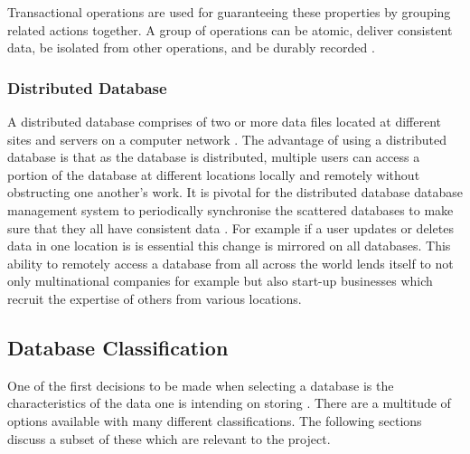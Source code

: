 Transactional operations are used for guaranteeing these properties by grouping related actions together. A group of operations can be atomic, deliver consistent data, be isolated from other operations, and be durably recorded \cite{acidtrans}.

\subsubsection{Distributed Database}\label{distributeddb}
A distributed database comprises of two or more data files located at different sites and servers on a computer network \cite{dd}. The advantage of using a distributed database is that as the database is distributed, multiple users can access a portion of the database at different locations locally and remotely without obstructing one another's work. It is  pivotal for the distributed database database management system to periodically synchronise the scattered databases to make sure that they all have consistent data \cite{dd}. For example if a user updates or deletes data in one location is is essential this change is mirrored on all databases. This ability to remotely access a database from all across the world lends itself to not only multinational companies for example but also start-up businesses which recruit the expertise of others from various locations.

\subsection{Database Classification}\label{dbclass}
One of the first decisions to be made when selecting a database is the characteristics of the data one is intending on storing \cite{nosql2}. There are a multitude of options available with many different classifications. The following sections discuss a subset of these which are relevant to the project.

